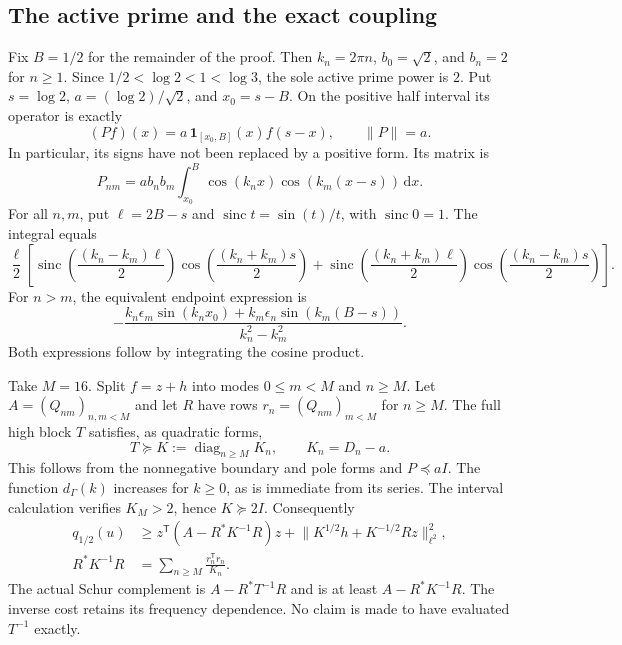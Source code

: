 \documentclass[11pt]{article}
\newcommand{\dd}{\,\mathrm d}
\newcommand{\norm}[1]{\lVert#1\rVert}
\begin{document}
\subsection{The active prime and the exact coupling}
Fix $B=1/2$ for the remainder of the proof. Then $k_n=2\pi n$,
$b_0=\sqrt2$, and $b_n=2$ for $n\ge1$. Since
$1/2<\log2<1<\log3$, the sole active prime power is $2$.
Put $s=\log2$, $a=(\log2)/\sqrt2$, and $x_0=s-B$.
On the positive half interval its operator is exactly
\[
 (Pf)(x)=a\,\mathbf1_{[x_0,B]}(x)f(s-x),\qquad \norm P=a.
\]
In particular, its signs have not been replaced by a positive form.
Its matrix is
\begin{equation}\label{eq:prime-cosine}
 P_{nm}=ab_nb_m\int_{x_0}^B
           \cos(k_nx)\cos(k_m(x-s))\dd x.
\end{equation}
For all $n,m$, put $\ell=2B-s$ and $\operatorname{sinc}t=\sin(t)/t$,
with $\operatorname{sinc}0=1$. The integral equals
\[
 \frac\ell2\left[
 \operatorname{sinc}\!\left(\frac{(k_n-k_m)\ell}2\right)
       \cos\!\left(\frac{(k_n+k_m)s}2\right)
 +\operatorname{sinc}\!\left(\frac{(k_n+k_m)\ell}2\right)
       \cos\!\left(\frac{(k_n-k_m)s}2\right)\right].
\]
For $n>m$, the equivalent endpoint expression is
\begin{equation}\label{eq:prime-endpoints}
 -\frac{k_n\epsilon_m\sin(k_nx_0)
          +k_m\epsilon_n\sin(k_m(B-s))}{k_n^2-k_m^2}.
\end{equation}
Both expressions follow by integrating the cosine product.

Take $M=16$. Split $f=z+h$ into modes $0\le m<M$ and $n\ge M$.
Let $A=(Q_{nm})_{n,m<M}$ and let $R$ have rows
$r_n=(Q_{nm})_{m<M}$ for $n\ge M$.
The full high block $T$ satisfies, as quadratic forms,
\begin{equation}\label{eq:high-diagonal}
 T\succeq K:=\operatorname{diag}_{n\ge M}K_n,
 \qquad K_n=D_n-a.
\end{equation}
This follows from the nonnegative boundary and pole forms and
$P\preceq aI$. The function $d_\Gamma(k)$ increases for $k\ge0$,
as is immediate from its series. The interval calculation verifies
$K_M>2$, hence $K\succeq2I$.
Consequently
\begin{equation}\label{eq:schur-frequency}
 \begin{split}
 q_{1/2}(u)&\ge
 z^{\mathsf T}(A-R^*K^{-1}R)z+
 \norm{K^{1/2}h+K^{-1/2}Rz}_{\ell^2}^2,\\
 R^*K^{-1}R&=\sum_{n\ge M}\frac{r_n^{\mathsf T}r_n}{K_n}.
 \end{split}
\end{equation}
The actual Schur complement is $A-R^*T^{-1}R$ and is at least
$A-R^*K^{-1}R$. The inverse cost retains its frequency dependence.
No claim is made to have evaluated $T^{-1}$ exactly.
\end{document}
